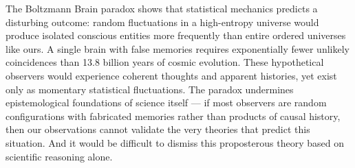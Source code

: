 The Boltzmann Brain paradox shows that statistical mechanics predicts a disturbing outcome: random fluctuations in a high-entropy universe would produce isolated conscious entities more frequently than entire ordered universes like ours. A single brain with false memories requires exponentially fewer unlikely coincidences than 13.8 billion years of cosmic evolution. These hypothetical observers would experience coherent thoughts and apparent histories, yet exist only as momentary statistical fluctuations. The paradox undermines epistemological foundations of science itself — if most observers are random configurations with fabricated memories rather than products of causal history, then our observations cannot validate the very theories that predict this situation. And it would be difficult to dismiss this proposterous theory based on scientific reasoning alone.
